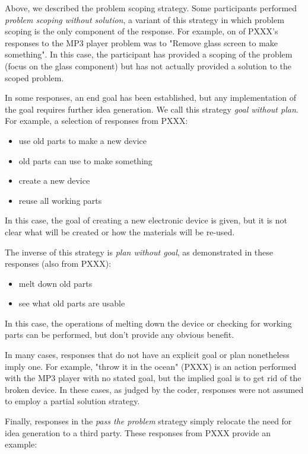 Above, we described the problem scoping strategy. Some participants performed \emph{problem scoping without solution}, a variant of this strategy in which problem scoping is the only component of the response.
For example, on of PXXX's responses to the MP3 player problem was to "Remove glass screen to make something". In this case, the participant has provided a scoping of the problem (focus on the glass component) but has not actually provided a solution to the scoped problem.

In some responses, an end goal has been established, but any implementation of the goal requires further idea generation. We call this strategy \emph{goal without plan}. For example, a selection of responses from PXXX:

\begin{itemize}
    \item use old parts to make a new device
    \item old parts can use to make something
    \item create a new device
    \item reuse all working parts
\end{itemize}

In this case, the goal of creating a new electronic device is given, but it is not clear what will be created or how the materials will be re-used.

The inverse of this strategy is \emph{plan without goal}, as demonstrated in these responses (also from PXXX):

\begin{itemize}
    \item melt down old parts
    \item see what old parts are usable
\end{itemize}

In this case, the operations of melting down the device or checking for working parts can be performed, but don't provide any obvious benefit.

In many cases, responses that do not have an explicit goal or plan nonetheless imply one. For example, "throw it in the ocean" (PXXX) is an action performed with the MP3 player with no stated goal, but the implied goal is to get rid of the broken device. In these cases, as judged by the coder, responses were not assumed to employ a partial solution strategy.

Finally, responses in the \emph{pass the problem} strategy simply relocate the need for idea generation to a third party. These responses from PXXX provide an example:

